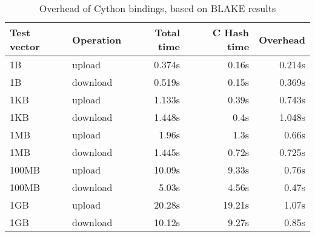 \begin{table}
  \centering
  \caption{Overhead of Cython bindings, based on BLAKE results}
  \begin{tabular}{ | l | l | r | r | r |}
    \hline
    \textbf{Test vector} & \textbf{Operation} & \textbf{Total time} & \textbf{C Hash time} & \textbf{Overhead} \\ \hline
    1B     &  upload    &  0.374s  &  0.16s   &  0.214s  \\  \hline
    1B     &  download  &  0.519s  &  0.15s   &  0.369s  \\  \hline
    1KB    &  upload    &  1.133s  &  0.39s   &  0.743s  \\  \hline
    1KB    &  download  &  1.448s  &  0.4s    &  1.048s  \\  \hline
    1MB    &  upload    &  1.96s   &  1.3s    &  0.66s   \\  \hline
    1MB    &  download  &  1.445s  &  0.72s   &  0.725s  \\  \hline
    100MB  &  upload    &  10.09s  &  9.33s   &  0.76s   \\  \hline
    100MB  &  download  &  5.03s   &  4.56s   &  0.47s   \\  \hline
    1GB    &  upload    &  20.28s  &  19.21s  &  1.07s   \\  \hline
    1GB    &  download  &  10.12s  &  9.27s   &  0.85s   \\  \hline

  \end{tabular}
  \label{tbl:cython:overhead}
\end{table}
